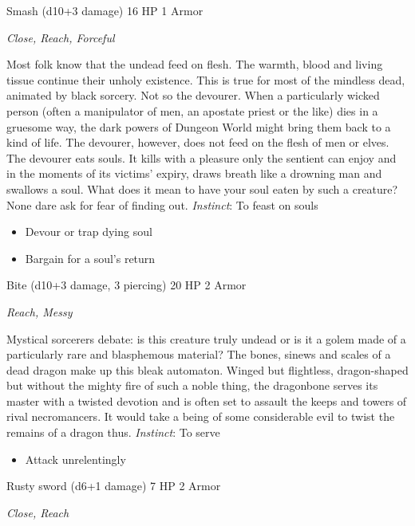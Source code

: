 Smash (d10+3 damage)\hspace*{\fill} 16 HP 1 Armor

\emph{Close, Reach, Forceful}

\HRule
Most folk know that the undead feed on flesh. The warmth, blood and living tissue continue their unholy existence. This is true for most of the mindless dead, animated by black sorcery. Not so the devourer. When a particularly wicked person (often a manipulator of men, an apostate priest or the like) dies in a gruesome way, the dark powers of Dungeon World might bring them back to a kind of life. The devourer, however, does not feed on the flesh of men or elves. The devourer eats souls. It kills with a pleasure only the sentient can enjoy and in the moments of its victims' expiry, draws breath like a drowning man and swallows a soul. What does it mean to have your soul eaten by such a creature? None dare ask for fear of finding out. \emph{Instinct}: To feast on souls
\begin{itemize}
\item Devour or trap dying soul
\item Bargain for a soul's return
\end{itemize}

\HRule
{}

Bite (d10+3 damage, 3 piercing)\hspace*{\fill} 20 HP 2 Armor

\emph{Reach, Messy}

\HRule
Mystical sorcerers debate: is this creature truly undead or is it a golem made of a particularly rare and blasphemous material? The bones, sinews and scales of a dead dragon make up this bleak automaton. Winged but flightless, dragon-shaped but without the mighty fire of such a noble thing, the dragonbone serves its master with a twisted devotion and is often set to assault the keeps and towers of rival necromancers. It would take a being of some considerable evil to twist the remains of a dragon thus. \emph{Instinct}: To serve
\begin{itemize}
\item Attack unrelentingly
\end{itemize}
\newpage
\HRule
{}

Rusty sword (d6+1 damage)\hspace*{\fill} 7 HP 2 Armor

\emph{Close, Reach}

